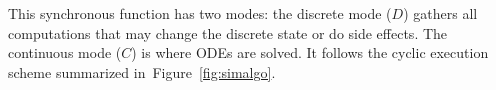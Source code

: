 \documentclass[11pt,titlepage,twoside]{report}
\newcommand{\lx}{\ensuremath{\mathit{lx}}}
\newcommand{\reffig}[1]{Figure~\ref{fig:#1}}
\begin{document}
This synchronous function has two modes: the discrete mode ($D$) gathers
all computations that may change the discrete state or
do side effects. The continuous mode ($C$) is where ODEs are solved. 
It follows the cyclic execution scheme summarized in~\reffig{simalgo}.



\end{document}
